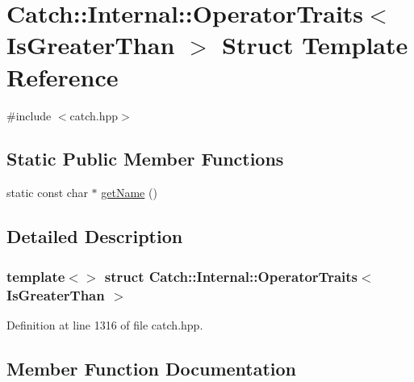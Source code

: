 \hypertarget{struct_catch_1_1_internal_1_1_operator_traits_3_01_is_greater_than_01_4}{}\section{Catch\+:\+:Internal\+:\+:Operator\+Traits$<$ Is\+Greater\+Than $>$ Struct Template Reference}
\label{struct_catch_1_1_internal_1_1_operator_traits_3_01_is_greater_than_01_4}


{\ttfamily \#include $<$catch.\+hpp$>$}

\subsection*{Static Public Member Functions}
\begin{DoxyCompactItemize}
\item 
static const char $\ast$ \hyperlink{struct_catch_1_1_internal_1_1_operator_traits_3_01_is_greater_than_01_4_ab917bfb9ccbe461dc684ee5a34d67d27}{get\+Name} ()
\end{DoxyCompactItemize}


\subsection{Detailed Description}
\subsubsection*{template$<$$>$\newline
struct Catch\+::\+Internal\+::\+Operator\+Traits$<$ Is\+Greater\+Than $>$}



Definition at line 1316 of file catch.\+hpp.



\subsection{Member Function Documentation}
\hypertarget{struct_catch_1_1_internal_1_1_operator_traits_3_01_is_greater_than_01_4_ab917bfb9ccbe461dc684ee5a34d67d27}{}\label{struct_catch_1_1_internal_1_1_operator_traits_3_01_is_greater_than_01_4_ab917bfb9ccbe461dc684ee5a34d67d27} 
